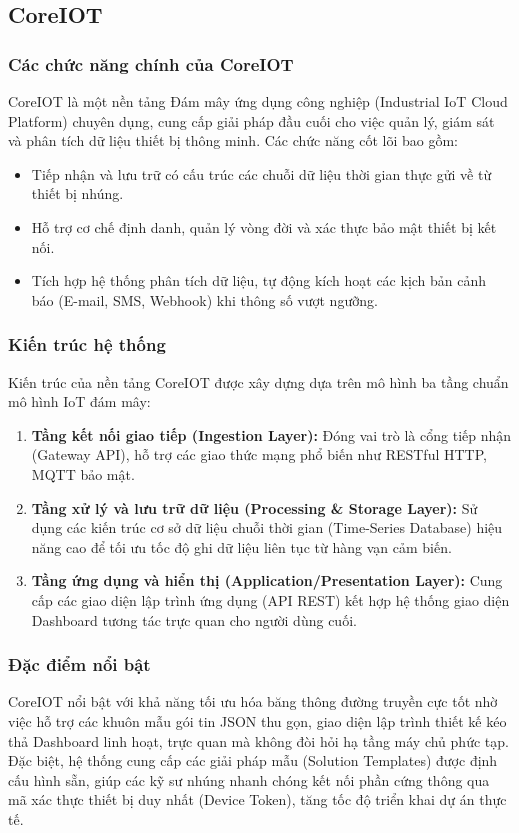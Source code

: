 \subsection{CoreIOT}

\subsubsection{Các chức năng chính của CoreIOT}
CoreIOT là một nền tảng Đám mây ứng dụng công nghiệp (Industrial IoT Cloud Platform) chuyên dụng, cung cấp giải pháp đầu cuối cho việc quản lý, giám sát và phân tích dữ liệu thiết bị thông minh. Các chức năng cốt lõi bao gồm:
\begin{itemize}
    \item Tiếp nhận và lưu trữ có cấu trúc các chuỗi dữ liệu thời gian thực gửi về từ thiết bị nhúng.
    \item Hỗ trợ cơ chế định danh, quản lý vòng đời và xác thực bảo mật thiết bị kết nối.
    \item Tích hợp hệ thống phân tích dữ liệu, tự động kích hoạt các kịch bản cảnh báo (E-mail, SMS, Webhook) khi thông số vượt ngưỡng.
\end{itemize}

\subsubsection{Kiến trúc hệ thống}
Kiến trúc của nền tảng CoreIOT được xây dựng dựa trên mô hình ba tầng chuẩn mô hình IoT đám mây:
\begin{enumerate}
    \item \textbf{Tầng kết nối giao tiếp (Ingestion Layer):} Đóng vai trò là cổng tiếp nhận (Gateway API), hỗ trợ các giao thức mạng phổ biến như RESTful HTTP, MQTT bảo mật.
    \item \textbf{Tầng xử lý và lưu trữ dữ liệu (Processing \& Storage Layer):} Sử dụng các kiến trúc cơ sở dữ liệu chuỗi thời gian (Time-Series Database) hiệu năng cao để tối ưu tốc độ ghi dữ liệu liên tục từ hàng vạn cảm biến.
    \item \textbf{Tầng ứng dụng và hiển thị (Application/Presentation Layer):} Cung cấp các giao diện lập trình ứng dụng (API REST) kết hợp hệ thống giao diện Dashboard tương tác trực quan cho người dùng cuối.
\end{enumerate}

\subsubsection{Đặc điểm nổi bật}
CoreIOT nổi bật với khả năng tối ưu hóa băng thông đường truyền cực tốt nhờ việc hỗ trợ các khuôn mẫu gói tin JSON thu gọn, giao diện lập trình thiết kế kéo thả Dashboard linh hoạt, trực quan mà không đòi hỏi hạ tầng máy chủ phức tạp. Đặc biệt, hệ thống cung cấp các giải pháp mẫu (Solution Templates) được định cấu hình sẵn, giúp các kỹ sư nhúng nhanh chóng kết nối phần cứng thông qua mã xác thực thiết bị duy nhất (Device Token), tăng tốc độ triển khai dự án thực tế.

